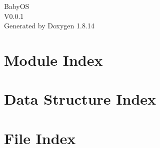 \documentclass[twoside]{book}
\newcommand{\+}{\discretionary{\mbox{\scriptsize$\hookleftarrow$}}{}{}}
\newcommand{\clearemptydoublepage}{%
  \newpage{\pagestyle{empty}\cleardoublepage}%
}
\begin{document}
\hypersetup{pageanchor=false,
             bookmarksnumbered=true,
             pdfencoding=unicode
            }
\begin{titlepage}
\vspace*{7cm}
\begin{center}%
{\Large Baby\+OS \\[1ex]\large V0.\+0.\+1 }\\
\vspace*{1cm}
{\large Generated by Doxygen 1.8.14}\\
\end{center}
\end{titlepage}
\clearemptydoublepage
{}
\tableofcontents
\clearemptydoublepage
{}
\hypersetup{pageanchor=true}

\chapter{Module Index}

\chapter{Data Structure Index}

\chapter{File Index}

\end{document}
